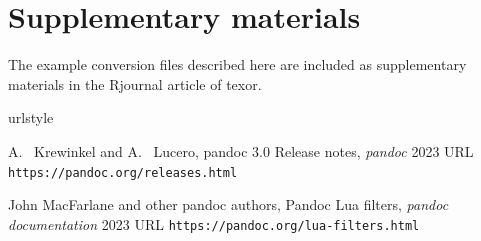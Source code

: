 \section{Supplementary materials}
The example conversion files described here are included as supplementary materials
in the Rjournal article of texor.

\begin{thebibliography}{2}
    \providecommand{\natexlab}[1]{#1}
    \providecommand{\url}[1]{\texttt{#1}}
    \expandafter\ifx\csname urlstyle\endcsname\relax
      \providecommand{\doi}[1]{doi: #1}\else
      \providecommand{\doi}{doi: \begingroup \urlstyle{rm}\Url}\fi

A.~ Krewinkel and A.~ Lucero,
\newblock pandoc 3.0 Release notes,
\newblock \emph{pandoc}  2023
\newblock URL \url{https://pandoc.org/releases.html}

John MacFarlane and other pandoc authors,
\newblock Pandoc Lua filters,
\newblock \emph{pandoc documentation}  2023
\newblock URL \url{https://pandoc.org/lua-filters.html}

\end{thebibliography}


\address{%
Abhishek Ulayil\\
Student, Institute of Actuaries of India\\%
Mumbai, India\\
ORCiD: 0009-0000-6935-8690\\
}
